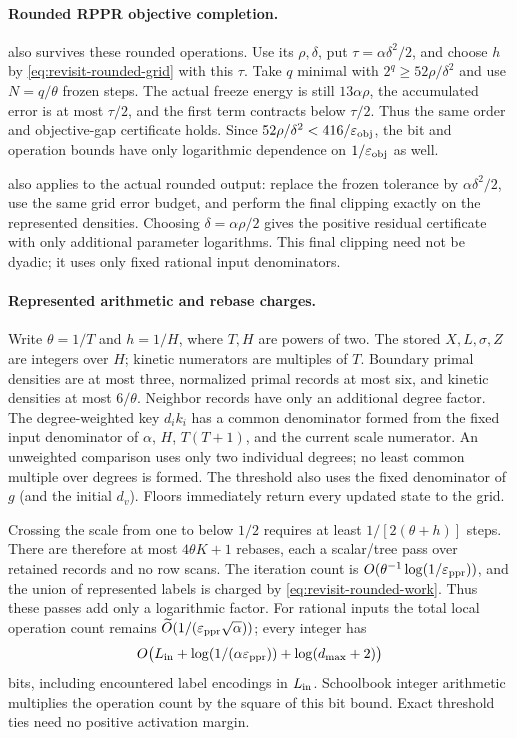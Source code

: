 \paragraph{Rounded RPPR objective completion.}
 also survives these rounded operations.
Use its $\rho,\delta$, put $\tau=\alpha\delta^2/2$, and choose $h$
by \cref{eq:revisit-rounded-grid} with this $\tau$.
Take $q$ minimal with $2^q\geq52\rho/\delta^2$ and use $N=q/\theta$
frozen steps. The actual freeze energy is still $13\alpha\rho$,
the accumulated error is at most $\tau/2$, and the first term contracts
below $\tau/2$. Thus the same order and objective-gap certificate holds.
Since $52\rho/\delta^2<416/\varepsilon_{\mathrm{obj}}$, the bit and operation bounds
have only logarithmic dependence on $1/\varepsilon_{\mathrm{obj}}$ as well.

 also applies to the actual rounded
output: replace the frozen tolerance by $\alpha\delta^2/2$, use the
same grid error budget, and perform the final clipping exactly on the
represented densities. Choosing $\delta=\alpha\rho/2$ gives the positive
residual certificate with only additional parameter logarithms. This final
clipping need not be dyadic; it uses only fixed rational input denominators.

\paragraph{Represented arithmetic and rebase charges.}
Write $\theta=1/T$ and $h=1/H$, where $T,H$ are powers of two.
The stored $X,L,\sigma,Z$ are integers over $H$; kinetic numerators
are multiples of $T$. Boundary primal densities are at most three,
normalized primal records at most six, and kinetic densities at most
$6/\theta$. Neighbor records have only an additional degree factor.
The degree-weighted key $d_i k_i$ has a common denominator formed from
the fixed input denominator of $\alpha$, $H$, $T(T+1)$, and the current
scale numerator. An unweighted comparison uses only two individual
degrees; no least common multiple over degrees is formed. The threshold
also uses the fixed denominator of $g$ (and the initial $d_v$).
Floors immediately return every updated state to the grid.

Crossing the scale from one to below $1/2$ requires at least
$1/[2(\theta+h)]$ steps. There are therefore at most $4\theta K+1$
rebases, each a scalar/tree pass over retained records and no row scans.
The iteration count is $O(\theta^{-1}\log(1/\varepsilon_{\mathrm{ppr}}))$, and the union
of represented labels is charged by \cref{eq:revisit-rounded-work}.
Thus these passes add only a logarithmic factor.
For rational inputs the total local operation count remains
$\widetilde O(1/(\varepsilon_{\mathrm{ppr}}\sqrt\alpha))$; every integer has
\[
 O\bigl(L_{\rm in}+\log(1/(\alpha\varepsilon_{\mathrm{ppr}}))
                +\log(d_{\max}+2)\bigr)
\]
bits, including encountered label encodings in $L_{\rm in}$.
Schoolbook integer arithmetic multiplies the operation count by the square
of this bit bound. Exact threshold ties need no positive activation margin.
